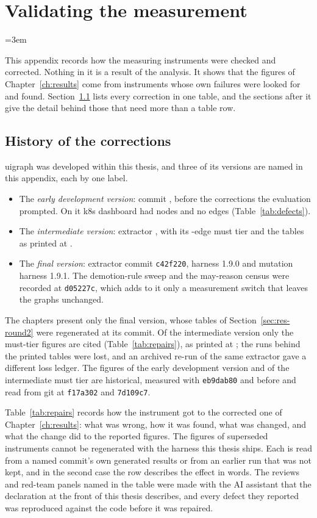 \chapter{Validating the measurement}
\label{app:validation}
\emergencystretch=3em

This appendix records how the measuring instruments were checked and corrected. Nothing in it is a result of the analysis. It shows that the figures of Chapter~\ref{ch:results} come from instruments whose own failures were looked for and found. Section~\ref{app:repairs} lists every correction in one table, and the sections after it give the detail behind those that need more than a table row.

\section{History of the corrections}
\label{app:repairs}

uigraph was developed within this thesis, and three of its versions are named in this appendix, each by one label.
\begin{itemize}
\item The \emph{early development version}: commit \EarlierCommit{}, before the corrections the evaluation
  prompted. On it k8s dashboard had nodes and no edges (Table~\ref{tab:defects}).
\item The \emph{intermediate version}: extractor \RoundExtractor{}, with its
\RoundMustEdges{}-edge must tier and the tables as printed at \RoundCommit{}.
\item The \emph{final version}: extractor commit \texttt{c42f220}, harness 1.9.0 and mutation
harness 1.9.1. The demotion-rule sweep and the may-reason census were recorded at
\texttt{d05227c}, which adds to it only a measurement switch that leaves the graphs unchanged.
\end{itemize}
The chapters present only the final version, whose tables of Section~\ref{sec:res-round2} were regenerated at its commit.
Of the intermediate version only the must-tier figures are cited (Table~\ref{tab:repairs}), as printed at \RoundCommit{}; the runs behind
the printed tables were lost, and an archived re-run of the same extractor gave a different loss ledger.
The figures of the early development version and of the intermediate must tier are historical, measured with
\texttt{eb9dab80} and before and read from git at \texttt{f17a302} and \texttt{7d109c7}.

Table~\ref{tab:repairs} records how the instrument got to the corrected one of Chapter~\ref{ch:results}: what was wrong, how it was found, what was changed, and what the change did to the reported figures. The figures of superseded instruments cannot be regenerated with the harness this thesis ships. Each is read from a named commit's own generated results or from an earlier run that was not kept, and in the second case the row describes the effect in words. The reviews and red-team panels named in the table were made with the AI assistant that the declaration at the front of this thesis describes, and every defect they reported was reproduced against the code before it was repaired.

